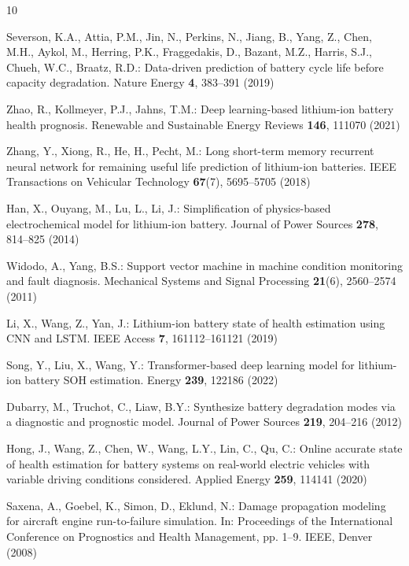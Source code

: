 \documentclass{sn-jnl}
\begin{document}
\begin{thebibliography}{10}

Severson, K.A., Attia, P.M., Jin, N., Perkins, N., Jiang, B., Yang, Z., Chen, M.H., Aykol, M., Herring, P.K., Fraggedakis, D., Bazant, M.Z., Harris, S.J., Chueh, W.C., Braatz, R.D.:
Data-driven prediction of battery cycle life before capacity degradation.
Nature Energy \textbf{4}, 383--391 (2019)

Zhao, R., Kollmeyer, P.J., Jahns, T.M.:
Deep learning-based lithium-ion battery health prognosis.
Renewable and Sustainable Energy Reviews \textbf{146}, 111070 (2021)

Zhang, Y., Xiong, R., He, H., Pecht, M.:
Long short-term memory recurrent neural network for remaining useful life prediction of lithium-ion batteries.
IEEE Transactions on Vehicular Technology \textbf{67}(7), 5695--5705 (2018)

Han, X., Ouyang, M., Lu, L., Li, J.:
Simplification of physics-based electrochemical model for lithium-ion battery.
Journal of Power Sources \textbf{278}, 814--825 (2014)

Widodo, A., Yang, B.S.:
Support vector machine in machine condition monitoring and fault diagnosis.
Mechanical Systems and Signal Processing \textbf{21}(6), 2560--2574 (2011)

Li, X., Wang, Z., Yan, J.:
Lithium-ion battery state of health estimation using CNN and LSTM.
IEEE Access \textbf{7}, 161112--161121 (2019)

Song, Y., Liu, X., Wang, Y.:
Transformer-based deep learning model for lithium-ion battery SOH estimation.
Energy \textbf{239}, 122186 (2022)

Dubarry, M., Truchot, C., Liaw, B.Y.:
Synthesize battery degradation modes via a diagnostic and prognostic model.
Journal of Power Sources \textbf{219}, 204--216 (2012)

Hong, J., Wang, Z., Chen, W., Wang, L.Y., Lin, C., Qu, C.:
Online accurate state of health estimation for battery systems on real-world electric vehicles with variable driving conditions considered.
Applied Energy \textbf{259}, 114141 (2020)

Saxena, A., Goebel, K., Simon, D., Eklund, N.:
Damage propagation modeling for aircraft engine run-to-failure simulation.
In: Proceedings of the International Conference on Prognostics and Health Management, pp. 1--9. IEEE, Denver (2008)

\end{thebibliography}
\end{document}
